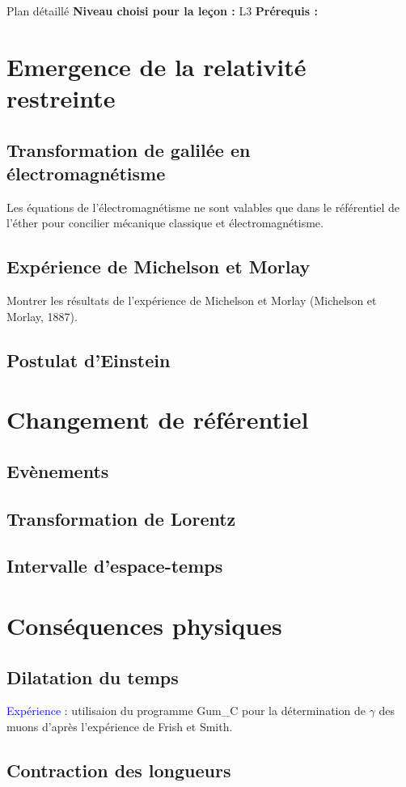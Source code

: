 \begin{reportBlock}{Plan détaillé}
  \textbf{Niveau choisi pour la leçon :} L3
  \newline
  \textbf{Prérequis : }
  \newline


\section{Emergence de la relativité restreinte}

\subsection{Transformation de galilée en électromagnétisme}
Les équations de l'électromagnétisme ne sont valables que dans le référentiel de l'éther pour concilier mécanique classique et électromagnétisme.
\subsection{Expérience de Michelson et Morlay}
Montrer les résultats de l'expérience de Michelson et Morlay (Michelson et Morlay, 1887). 

\subsection{Postulat d'Einstein}

\section{Changement de référentiel}

\subsection{Evènements}

\subsection{Transformation de Lorentz}

\subsection{Intervalle d'espace-temps}

\section{Conséquences physiques}
\subsection{Dilatation du temps}
\textcolor{blue}{Expérience :} utilisaion du programme Gum\_C pour la détermination de $\gamma$ des muons d'après l'expérience de Frish et Smith.
\subsection{Contraction des longueurs}

\end{reportBlock}